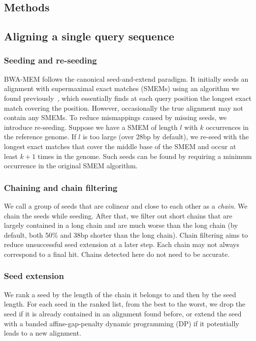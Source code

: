 \documentclass{bioinfo}
\begin{document}
\begin{methods}

\section{Methods}

\subsection{Aligning a single query sequence}

\subsubsection{Seeding and re-seeding} BWA-MEM follows the canonical
seed-and-extend paradigm. It initially seeds an alignment with supermaximal
exact matches (SMEMs) using an algorithm we found previously~\citep[Algorithm
5]{Li:2012fk}, which essentially finds at each query position the longest exact
match covering the position. However, occasionally the true alignment may not
contain any SMEMs.  To reduce mismappings caused by missing seeds, we introduce
re-seeding. Suppose we have a SMEM of length $l$ with $k$ occurrences in the
reference genome. If $l$ is too large (over 28bp by default), we re-seed
with the longest exact matches that cover the middle base of the SMEM and occur
at least $k+1$ times in the genome. Such seeds can be found by requiring a
minimum occurrence in the original SMEM algorithm.

\subsubsection{Chaining and chain filtering} We call a group of seeds that are
colinear and close to each other as a \emph{chain}. We chain the seeds while
seeding. After that, we filter out short chains that are largely contained in a
long chain and are much worse than the long chain (by default, both 50\% and
38bp shorter than the long chain). Chain filtering aims to reduce unsuccessful
seed extension at a later step. Each chain may not always correspond to a final
hit. Chains detected here do not need to be accurate.

\subsubsection{Seed extension} We rank a seed by the length of the chain it
belongs to and then by the seed length. For each seed in the ranked list, from
the best to the worst, we drop the seed if it is already contained in an
alignment found before, or extend the seed with a banded affine-gap-penalty
dynamic programming (DP) if it potentially leads to a new alignment.


\end{methods}
\end{document}
